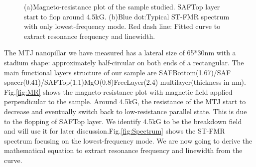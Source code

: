 \begin{figure}[!ht]
\centering
{}

\caption{(a)Magneto-resistance plot of the sample studied. SAFTop layer start to flop around 4.5kG. (b)Blue dot:Typical ST-FMR spectrum with only lowest-frequency mode. Red dash line: Fitted curve to extract resonance frequency and linewidth.}
\end{figure}

The MTJ nanopillar we have measured has a lateral size of 65*30nm with a stadium shape: approximately half-circular on both ends of a rectangular. The main functional layers structure of our sample are SAFBottom(1.67)/SAF spacer(0.41)/SAFTop(1.1)MgO(0.8)FreeLayer(2.4) multilayer(thickness in nm). Fig.\ref{fig:MR} shows the magneto-resistance plot with magnetic field applied perpendicular to the sample. Around 4.5kG, the resistance of the MTJ start to decrease and eventually switch back to low-resistance parallel state. This is due to the flopping of SAFTop layer\cite{Spinflop}. We identify 4.5kG to be the breakdown field and will use it for later discussion.Fig.\ref{fig:Spectrum} shows the ST-FMR spectrum focusing on the lowest-frequency mode. We are now going to derive the mathematical equation to extract resonance frequency and linewidth from the curve.



